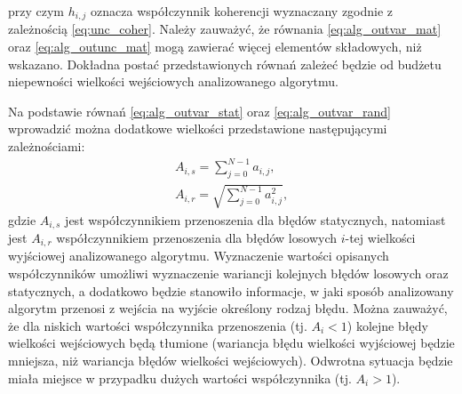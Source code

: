 przy czym $h_{i,j}$ oznacza współczynnik koherencji wyznaczany zgodnie z zależnością \eqref{eq:unc_coher}. Należy zauważyć, że równania \eqref{eq:alg_outvar_mat} oraz \eqref{eq:alg_outunc_mat} mogą zawierać więcej elementów składowych, niż wskazano. Dokładna postać przedstawionych równań zależeć będzie od budżetu niepewności wielkości wejściowych analizowanego algorytmu.

Na podstawie równań \eqref{eq:alg_outvar_stat} oraz \eqref{eq:alg_outvar_rand} wprowadzić można dodatkowe wielkości przedstawione następującymi zależnościami:
\begin{gather}
A_{i,s} = \sum _{j = 0} ^{N-1} a_{i, j} \label{eq:alg_trans_stat}, \\
A_{i,r} = \sqrt{\sum _{j = 0} ^{N-1} a_{i, j}^{2}} \label{eq:alg_trans_rand},
\end{gather}
gdzie $A_{i,s}$ jest współczynnikiem przenoszenia dla błędów statycznych, natomiast jest $A_{i,r}$ współczynnikiem przenoszenia dla błędów losowych $i$-tej wielkości wyjściowej analizowanego algorytmu. Wyznaczenie wartości opisanych współczynników umożliwi wyznaczenie wariancji kolejnych błędów losowych oraz statycznych, a dodatkowo będzie stanowiło informacje, w jaki sposób analizowany algorytm przenosi z wejścia na wyjście określony rodzaj błędu. Można zauważyć, że dla niskich wartości współczynnika przenoszenia (tj. $A_{i} < 1$) kolejne błędy wielkości wejściowych będą tłumione (wariancja błędu wielkości wyjściowej będzie mniejsza, niż wariancja błędów wielkości wejściowych). Odwrotna sytuacja będzie miała miejsce w przypadku dużych wartości współczynnika (tj. $A_{i} > 1$).

